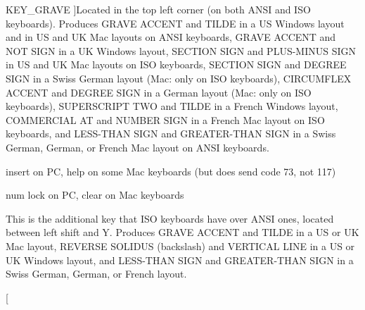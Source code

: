 \begin{Desc}
\begin{description}
{\hypertarget{classphys_1_1MetaCode_a3e501cbb5bf0f6f1fdb7211465bda8d8a1961eccca163bf3ceb9e6dea3c23375c}{
KEY\_\-GRAVE}
\label{da/dc9/classphys_1_1MetaCode_a3e501cbb5bf0f6f1fdb7211465bda8d8a1961eccca163bf3ceb9e6dea3c23375c}
}]Located in the top left corner (on both ANSI and ISO keyboards). Produces GRAVE ACCENT and TILDE in a US Windows layout and in US and UK Mac layouts on ANSI keyboards, GRAVE ACCENT and NOT SIGN in a UK Windows layout, SECTION SIGN and PLUS-\/MINUS SIGN in US and UK Mac layouts on ISO keyboards, SECTION SIGN and DEGREE SIGN in a Swiss German layout (Mac: only on ISO keyboards), CIRCUMFLEX ACCENT and DEGREE SIGN in a German layout (Mac: only on ISO keyboards), SUPERSCRIPT TWO and TILDE in a French Windows layout, COMMERCIAL AT and NUMBER SIGN in a French Mac layout on ISO keyboards, and LESS-\/THAN SIGN and GREATER-\/THAN SIGN in a Swiss German, German, or French Mac layout on ANSI keyboards. \item[{\em 
\hypertarget{classphys_1_1MetaCode_a3e501cbb5bf0f6f1fdb7211465bda8d8a708ea6204b1cc2ed7756989b8d850ce6}{
KEY\_\-INSERT}
\label{da/dc9/classphys_1_1MetaCode_a3e501cbb5bf0f6f1fdb7211465bda8d8a708ea6204b1cc2ed7756989b8d850ce6}
}]insert on PC, help on some Mac keyboards (but does send code 73, not 117) \item[{\em 
\hypertarget{classphys_1_1MetaCode_a3e501cbb5bf0f6f1fdb7211465bda8d8a7cd4a721f5b2be2cc13856a46199508a}{
KEY\_\-NUMLOCKCLEAR}
\label{da/dc9/classphys_1_1MetaCode_a3e501cbb5bf0f6f1fdb7211465bda8d8a7cd4a721f5b2be2cc13856a46199508a}
}]num lock on PC, clear on Mac keyboards \item[{\em 
\hypertarget{classphys_1_1MetaCode_a3e501cbb5bf0f6f1fdb7211465bda8d8a858a1c9e3bd7b047e05220da9b0a3966}{
KEY\_\-NONUSBACKSLASH}
\label{da/dc9/classphys_1_1MetaCode_a3e501cbb5bf0f6f1fdb7211465bda8d8a858a1c9e3bd7b047e05220da9b0a3966}
}]This is the additional key that ISO keyboards have over ANSI ones, located between left shift and Y. Produces GRAVE ACCENT and TILDE in a US or UK Mac layout, REVERSE SOLIDUS (backslash) and VERTICAL LINE in a US or UK Windows layout, and LESS-\/THAN SIGN and GREATER-\/THAN SIGN in a Swiss German, German, or French layout. \item[{\em 
}
\end{description}
\end{Desc}

